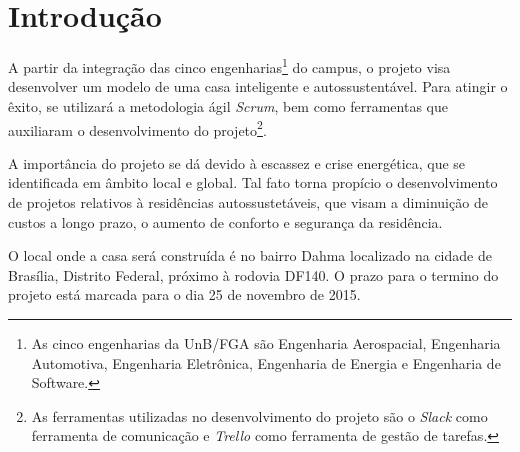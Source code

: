\section{Introdução}

	A partir da integração das cinco engenharias\footnote{As cinco engenharias da UnB/FGA são Engenharia Aerospacial, Engenharia Automotiva, Engenharia Eletrônica, Engenharia de Energia e Engenharia de Software.} do campus, o projeto visa desenvolver um modelo de uma casa inteligente e autossustentável. Para atingir o êxito, se utilizará a metodologia ágil \textit{Scrum}, bem como ferramentas que auxiliaram o desenvolvimento do projeto\footnote{As ferramentas utilizadas no desenvolvimento do projeto são o \textit{Slack} como ferramenta de comunicação e \textit{Trello} como ferramenta de gestão de tarefas.}.

	A importância do projeto se dá devido à escassez e crise energética, que se identificada em âmbito local e global. Tal fato torna propício o desenvolvimento de projetos relativos à residências autossustetáveis, que visam a diminuição de custos a longo prazo, o aumento de conforto e segurança da residência.

	O local onde a casa será construída é no bairro Dahma localizado na cidade de Brasília, Distrito Federal, próximo à rodovia DF140. O prazo para o termino do projeto está marcada para o dia 25 de novembro de 2015. 